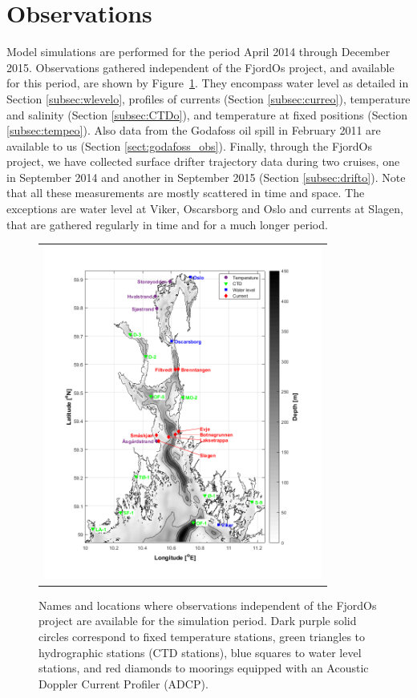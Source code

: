 \clearpage
\section{Observations}
\label{sec:obser}

Model simulations are performed for the period April 2014 through December 2015. Observations gathered independent of the FjordOs project, and available for this period, are shown by Figure~\ref{fig:kart_obs}. They encompass water level as detailed in Section \ref{subsec:wlevelo}, profiles of currents (Section \ref{subsec:curreo}), temperature and salinity (Section \ref{subsec:CTDo}), and temperature at fixed positions (Section \ref{subsec:tempeo}). Also data from the Godafoss oil spill in February 2011 are available to us (Section \ref{sect:godafoss_obs}). Finally, through the FjordOs project, we have collected surface drifter trajectory data during two cruises, one in September 2014 and another in September 2015 (Section \ref{subsec:drifto}). Note that all these measurements are mostly scattered in time and space. The exceptions are water level at Viker, Oscarsborg and Oslo and currents at Slagen, that are gathered regularly in time and for a much longer period.

\begin{figure}[htb]
  \begin{center}
    \begin{tabular}{c}
      \includegraphics*[height=11cm]{Figurer/kart_obs} \\ 
    \end{tabular}
    \caption{\small Names and locations where observations independent of the FjordOs project are available for the simulation period. Dark purple solid circles correspond to fixed temperature stations, green triangles to hydrographic stations (CTD stations), blue squares to water level stations, and red diamonds to moorings equipped with an Acoustic Doppler Current Profiler (ADCP).}
    \label{fig:kart_obs}
  \end{center}
\end{figure}

